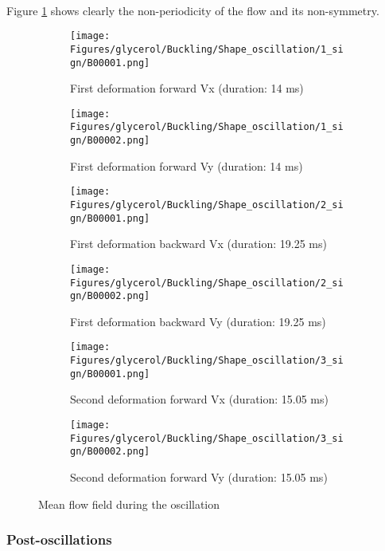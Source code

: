 \documentclass[a4paper,10pt]{report}
\begin{document}
\paragraph{}
Figure \ref{fig:means_oscillation_glycerol} shows clearly the non-periodicity of the flow and its non-symmetry.
\begin{figure}[htbp]%
	\centering%
		\begin{subfigure}[h]{0.5\textwidth}%
					\texttt{[image: Figures/glycerol/Buckling/Shape\_oscillation/1\_sign/B00001.png]}%
					\caption{First deformation forward Vx (duration: 14 ms) }%
			\end{subfigure}%
			\begin{subfigure}[h]{0.5\linewidth}%
					\texttt{[image: Figures/glycerol/Buckling/Shape\_oscillation/1\_sign/B00002.png]}%
					\caption{First deformation forward Vy (duration: 14 ms)}%
			\end{subfigure}%
			
			\begin{subfigure}[h]{0.5\textwidth}%
					\texttt{[image: Figures/glycerol/Buckling/Shape\_oscillation/2\_sign/B00001.png]}%
					\caption{First deformation backward Vx (duration: 19.25 ms) }%
			\end{subfigure}%
			\begin{subfigure}[h]{0.5\linewidth}%
					\texttt{[image: Figures/glycerol/Buckling/Shape\_oscillation/2\_sign/B00002.png]}%
					\caption{First deformation backward Vy (duration: 19.25 ms)}%
			\end{subfigure}%
			
			\begin{subfigure}[h]{0.5\textwidth}%
					\texttt{[image: Figures/glycerol/Buckling/Shape\_oscillation/3\_sign/B00001.png]}%
					\caption{Second deformation forward Vx (duration: 15.05 ms)}%
			\end{subfigure}%
			\begin{subfigure}[h]{0.5\linewidth}%
					\texttt{[image: Figures/glycerol/Buckling/Shape\_oscillation/3\_sign/B00002.png]}%
					\caption{Second deformation forward Vy (duration: 15.05 ms)}%
			\end{subfigure}%
		\caption{Mean flow field during the oscillation}
		\label{fig:means_oscillation_glycerol}%
\end{figure} 
\subsubsection{Post-oscillations}
\end{document}
